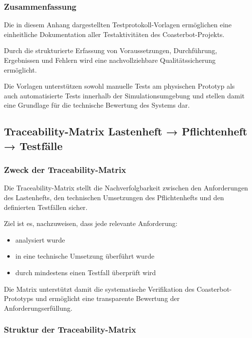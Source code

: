 \subsubsection{Zusammenfassung}\label{zusammenfassung-5}

Die in diesem Anhang dargestellten Testprotokoll-Vorlagen ermöglichen
eine einheitliche Dokumentation aller Testaktivitäten des
Coasterbot-Projekts.

Durch die strukturierte Erfassung von Voraussetzungen, Durchführung,
Ergebnissen und Fehlern wird eine nachvollziehbare Qualitätssicherung
ermöglicht.

Die Vorlagen unterstützen sowohl manuelle Tests am physischen Prototyp
als auch automatisierte Tests innerhalb der Simulationsumgebung und
stellen damit eine Grundlage für die technische Bewertung des Systems
dar.

\subsection{Traceability-Matrix Lastenheft → Pflichtenheft →
Testfälle}\label{traceability-matrix-lastenheft-pflichtenheft-testfuxe4lle}

\subsubsection{Zweck der
Traceability-Matrix}\label{zweck-der-traceability-matrix}

Die Traceability-Matrix stellt die Nachverfolgbarkeit zwischen den
Anforderungen des Lastenhefts, den technischen Umsetzungen des
Pflichtenhefts und den definierten Testfällen sicher.

Ziel ist es, nachzuweisen, dass jede relevante Anforderung:

\begin{itemize}
\tightlist
\item
  analysiert wurde
\item
  in eine technische Umsetzung überführt wurde
\item
  durch mindestens einen Testfall überprüft wird
\end{itemize}

Die Matrix unterstützt damit die systematische Verifikation des
Coasterbot-Prototyps und ermöglicht eine transparente Bewertung der
Anforderungserfüllung.

\subsubsection{Struktur der
Traceability-Matrix}\label{struktur-der-traceability-matrix}

